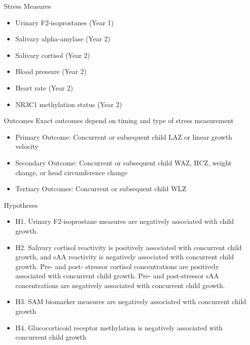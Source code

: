 \documentclass[
  ignorenonframetext,
]{beamer}
\providecommand{\tightlist}{%
  \setlength{\itemsep}{0pt}\setlength{\parskip}{0pt}}
\begin{document}
\begin{frame}{Stress Measures}
\protect\hypertarget{stress-measures}{}
\begin{itemize}[<+->]
\tightlist
\item
  Urinary F2-isoprostanes (Year 1)
\item
  Salivary alpha-amylase (Year 2)
\item
  Salivary cortisol (Year 2)
\item
  Blood pressure (Year 2)
\item
  Heart rate (Year 2)
\item
  NR3C1 methylation status (Year 2)
\end{itemize}
\end{frame}

\begin{frame}{Outcomes}
\protect\hypertarget{outcomes}{}
Exact outcomes depend on timing and type of stress measurement

\begin{itemize}[<+->]
\tightlist
\item
  Primary Outcome: Concurrent or subsequent child LAZ or linear growth
  velocity
\item
  Secondary Outcome: Concurrent or subsequent child WAZ, HCZ, weight
  change, or head circumference change
\item
  Tertiary Outcomes: Concurrent or subsequent child WLZ
\end{itemize}
\end{frame}

\begin{frame}{Hypotheses}
\protect\hypertarget{hypotheses}{}
\begin{itemize}[<+->]
\tightlist
\item
  H1. Urinary F2-isoprostane measures are negatively associated with
  child growth.
\item
  H2. Salivary cortisol reactivity is positively associated with
  concurrent child growth, and sAA reactivity is negatively associated
  with concurrent child growth. Pre- and post- stressor cortisol
  concentrations are positively associated with concurrent child growth.
  Pre- and post-stressor sAA concentrations are negatively associated
  with concurrent child growth.
\item
  H3. SAM biomarker measures are negatively associated with concurrent
  child growth
\item
  H4. Glucocorticoid receptor methylation is negatively associated with
  concurrent child growth
\end{itemize}
\end{frame}
\end{document}
